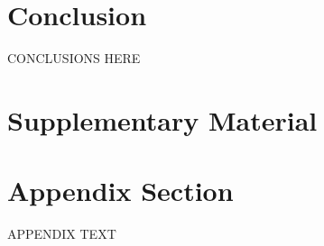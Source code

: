 \documentclass{article} %
\theoremstyle{plain}
\theoremstyle{definition}
\theoremstyle{remark}
\begin{document}
\section{Conclusion}
\label{sec:conclusion}
CONCLUSIONS HERE




\appendix

\section*{\LARGE Supplementary Material}
\label{sec:appendix}

\section{Appendix Section}
APPENDIX TEXT
\end{document}
